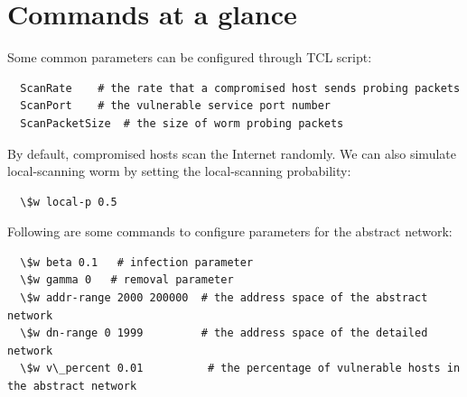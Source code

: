 \section{Commands at a glance}
\label{sec:worm:command}

Some common parameters can be configured through TCL script:
\begin{verbatim}
  ScanRate    # the rate that a compromised host sends probing packets
  ScanPort    # the vulnerable service port number
  ScanPacketSize  # the size of worm probing packets
\end{verbatim}

By default,
  compromised hosts scan the Internet randomly.
We can also simulate local-scanning worm by setting the local-scanning
  probability:
\begin{verbatim}
  \$w local-p 0.5    
\end{verbatim}


Following are some commands to configure parameters for the
  abstract network:

\begin{verbatim}
  \$w beta 0.1   # infection parameter
  \$w gamma 0   # removal parameter
  \$w addr-range 2000 200000  # the address space of the abstract network
  \$w dn-range 0 1999         # the address space of the detailed network
  \$w v\_percent 0.01          # the percentage of vulnerable hosts in the abstract network
\end{verbatim}

